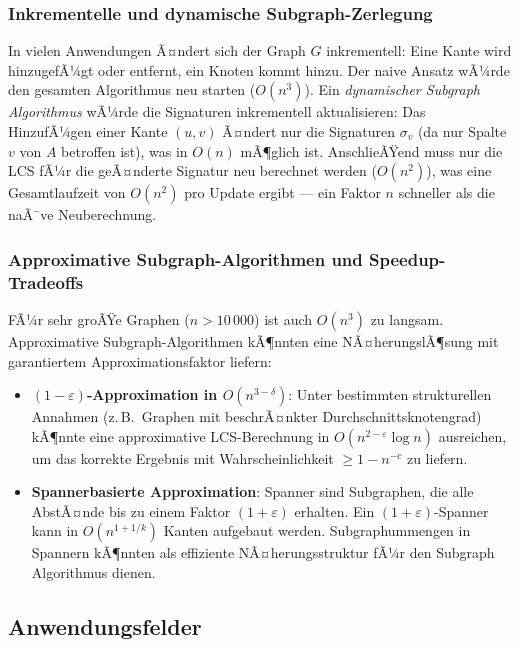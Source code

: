 ﻿\documentclass[a4paper,12pt]{article}
\theoremstyle{definition}
\begin{document}
\subsubsection{Inkrementelle und dynamische Subgraph-Zerlegung}

In vielen Anwendungen Ã¤ndert sich der Graph $G$ inkrementell:
Eine Kante wird hinzugefÃ¼gt oder entfernt, ein Knoten kommt hinzu.
Der naive Ansatz wÃ¼rde den gesamten Algorithmus neu starten ($O(n^3)$).
Ein \emph{dynamischer Subgraph Algorithmus} wÃ¼rde die Signaturen inkrementell
aktualisieren: Das HinzufÃ¼gen einer Kante $(u,v)$ Ã¤ndert nur die Signaturen
$\sigma_v$ (da nur Spalte $v$ von $A$ betroffen ist), was in $O(n)$ mÃ¶glich ist.
AnschlieÃŸend muss nur die LCS fÃ¼r die geÃ¤nderte Signatur neu berechnet werden
($O(n^2)$), was eine Gesamtlaufzeit von $O(n^2)$ pro Update ergibt ---
ein Faktor $n$ schneller als die naÃ¯ve Neuberechnung.

\subsubsection{Approximative Subgraph-Algorithmen und Speedup-Tradeoffs}

FÃ¼r sehr groÃŸe Graphen ($n > 10\,000$) ist auch $O(n^3)$ zu langsam.
Approximative Subgraph-Algorithmen kÃ¶nnten eine NÃ¤herungslÃ¶sung mit
garantiertem Approximationsfaktor liefern:
\begin{itemize}
  \item \textbf{$(1-\varepsilon)$-Approximation in $O(n^{3-\delta})$}:
        Unter bestimmten strukturellen Annahmen (z.\,B.\ Graphen mit beschrÃ¤nkter
        Durchschnittsknotengrad) kÃ¶nnte eine approximative LCS-Berechnung
        in $O(n^{2-\varepsilon} \log n)$ ausreichen, um das korrekte Ergebnis
        mit Wahrscheinlichkeit $\geq 1 - n^{-c}$ zu liefern.
  \item \textbf{Spannerbasierte Approximation}: Spanner sind Subgraphen, die alle
        AbstÃ¤nde bis zu einem Faktor $(1+\varepsilon)$ erhalten.
        Ein $(1+\varepsilon)$-Spanner kann in $O(n^{1+1/k})$ Kanten aufgebaut werden.
        Subgraphummengen in Spannern kÃ¶nnten als effiziente NÃ¤herungsstruktur
        fÃ¼r den Subgraph Algorithmus dienen.
\end{itemize}

\subsection{Anwendungsfelder}
\end{document}
